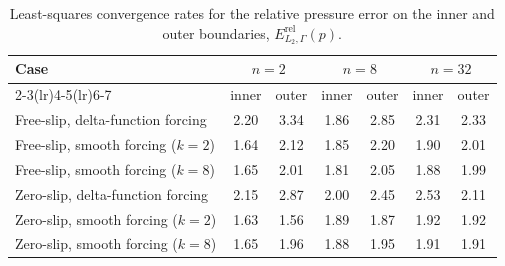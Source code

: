 \documentclass[11pt,a4paper]{article}
\begin{document}
\begin{table}[p]
\centering
\caption{Least-squares convergence rates for the relative pressure error on the inner and outer boundaries, \(E_{L_2,\Gamma}^{\mathrm{rel}}(p)\).}
\label{tab:kramer_annulus_boundary_pressure_lsq_rates}
\small
\setlength{\tabcolsep}{7pt}
\begin{tabular}{lcccccc}
\toprule
\multirow{2}{*}{Case} & \multicolumn{2}{c}{$n=2$} & \multicolumn{2}{c}{$n=8$} & \multicolumn{2}{c}{$n=32$} \\
\cmidrule(lr){2-3}\cmidrule(lr){4-5}\cmidrule(lr){6-7}
 & inner & outer & inner & outer & inner & outer \\
\midrule
Free-slip, delta-function forcing & 2.20 & 3.34 & 1.86 & 2.85 & 2.31 & 2.33 \\
Free-slip, smooth forcing ($k=2$) & 1.64 & 2.12 & 1.85 & 2.20 & 1.90 & 2.01 \\
Free-slip, smooth forcing ($k=8$) & 1.65 & 2.01 & 1.81 & 2.05 & 1.88 & 1.99 \\
Zero-slip, delta-function forcing & 2.15 & 2.87 & 2.00 & 2.45 & 2.53 & 2.11 \\
Zero-slip, smooth forcing ($k=2$) & 1.63 & 1.56 & 1.89 & 1.87 & 1.92 & 1.92 \\
Zero-slip, smooth forcing ($k=8$) & 1.65 & 1.96 & 1.88 & 1.95 & 1.91 & 1.91 \\
\bottomrule
\end{tabular}
\end{table}
\end{document}
